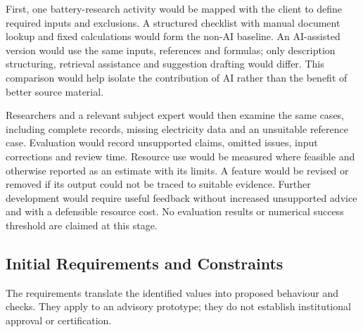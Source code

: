 \documentclass[11pt,a4paper]{article}
\begin{document}
First, one battery-research activity would be mapped with the client to define required inputs and exclusions. A structured checklist with manual document lookup and fixed calculations would form the non-AI baseline. An AI-assisted version would use the same inputs, references and formulas; only description structuring, retrieval assistance and suggestion drafting would differ. This comparison would help isolate the contribution of AI rather than the benefit of better source material.

Researchers and a relevant subject expert would then examine the same cases, including complete records, missing electricity data and an unsuitable reference case. Evaluation would record unsupported claims, omitted issues, input corrections and review time. Resource use would be measured where feasible and otherwise reported as an estimate with its limits. A feature would be revised or removed if its output could not be traced to suitable evidence. Further development would require useful feedback without increased unsupported advice and with a defensible resource cost. No evaluation results or numerical success threshold are claimed at this stage.

\FloatBarrier
\subsection{Initial Requirements and Constraints}
The requirements translate the identified values into proposed behaviour and checks. They apply to an advisory prototype; they do not establish institutional approval or certification.
\end{document}
